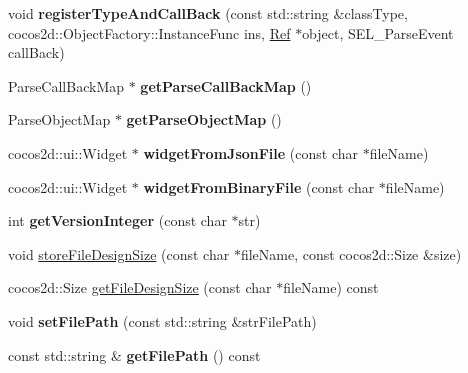 \begin{DoxyCompactItemize}
void {\bfseries register\+Type\+And\+Call\+Back} (const std\+::string \&class\+Type, cocos2d\+::\+Object\+Factory\+::\+Instance\+Func ins, \hyperlink{classRef}{Ref} $\ast$object, S\+E\+L\+\_\+\+Parse\+Event call\+Back)
\item 
\mbox{\label{classcocostudio_1_1GUIReader_a24578ecf812b642840fbc17ebf8131c4}} 
Parse\+Call\+Back\+Map $\ast$ {\bfseries get\+Parse\+Call\+Back\+Map} ()
\item 
\mbox{\label{classcocostudio_1_1GUIReader_a85fe9912947764b9e6d34956564d4887}} 
Parse\+Object\+Map $\ast$ {\bfseries get\+Parse\+Object\+Map} ()
\item 
\mbox{\label{classcocostudio_1_1GUIReader_a87111cd707c8be15b2f67458166d25fb}} 
cocos2d\+::ui\+::\+Widget $\ast$ {\bfseries widget\+From\+Json\+File} (const char $\ast$file\+Name)
\item 
\mbox{\label{classcocostudio_1_1GUIReader_ad37c46aef208dc62ca4397026dbb5e58}} 
cocos2d\+::ui\+::\+Widget $\ast$ {\bfseries widget\+From\+Binary\+File} (const char $\ast$file\+Name)
\item 
\mbox{\label{classcocostudio_1_1GUIReader_aac24ec52b134ad8005c3f8c3a5b0cd70}} 
int {\bfseries get\+Version\+Integer} (const char $\ast$str)
\item 
void \hyperlink{classcocostudio_1_1GUIReader_a2b5246b10e2a1af0171aa1caf108334b}{store\+File\+Design\+Size} (const char $\ast$file\+Name, const cocos2d\+::\+Size \&size)
\item 
cocos2d\+::\+Size \hyperlink{classcocostudio_1_1GUIReader_a5d16c996e4c47484d4a3df4794b2899f}{get\+File\+Design\+Size} (const char $\ast$file\+Name) const
\item 
\mbox{\label{classcocostudio_1_1GUIReader_a4a0bc0e013587c1d6705ae97c33ae669}} 
void {\bfseries set\+File\+Path} (const std\+::string \&str\+File\+Path)
\item 
\mbox{\label{classcocostudio_1_1GUIReader_a768c2cfa64750d5984cfb80811dcffad}} 
const std\+::string \& {\bfseries get\+File\+Path} () const
\item 

\end{DoxyCompactItemize}

